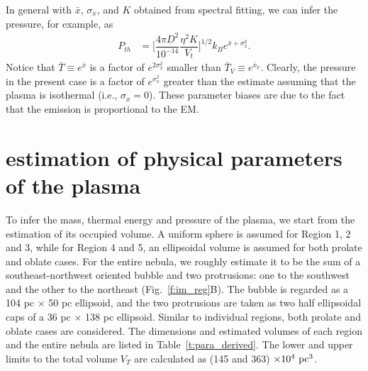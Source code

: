 \documentclass[usenatbib]{mnras}
\begin{document}
In general with $\bar{x}$, $\sigma_x$, and $K$ obtained from spectral fitting, we can infer the pressure, for example, as
\begin{equation}
\begin{split}
P_{th} & = \Big[\dfrac{4\pi D^2}{10^{-14}}\dfrac{\eta^2 K}{V_t}\Big]^{1/2} k_B e^{\bar{x}+\sigma_x^2}.
\end{split}
\label{e:p}
\end{equation}
Notice that $\bar{T} \equiv e^{\bar{x}}$ is a factor of $e^{2\sigma_x^2}$ smaller than $\bar{T}_V \equiv e^{\bar{x}_V}$.  Clearly, the pressure  in the present case is a factor of $e^{\sigma_x^2}$ greater than the estimate assuming that the plasma is isothermal (i.e., $\sigma_x =0$). These parameter biases are due to the fact that the emission is proportional to the EM. 

\section{estimation of physical parameters of the plasma}
\label{a:para}

To infer the mass, thermal energy and pressure of the plasma, we start from the estimation of its occupied volume. A uniform sphere is assumed for Region 1, 2 and 3, while for Region 4 and 5, an ellipsoidal volume is assumed for both prolate and oblate cases. For the entire nebula, we roughly estimate it to be the sum of a southeast-northwest oriented bubble and two protrusions: one to the southwest and the other to the northeast (Fig.~\ref{f:im_reg}B). The bubble is regarded as a 104 pc $\times$ 50 pc ellipsoid, and the two protrusions are taken as two half ellipsoidal caps of a 36 pc $\times$ 138 pc ellipsoid. Similar to individual regions, both prolate and oblate cases are considered. The dimensions and estimated volumes of each region and the entire nebula are listed in Table~\ref{t:para_derived}. The lower and upper limits to the total volume $V_T$ are calculated as (145 and 363) $\times 10^{4} {\rm~pc^{3}}$.
\end{document}
